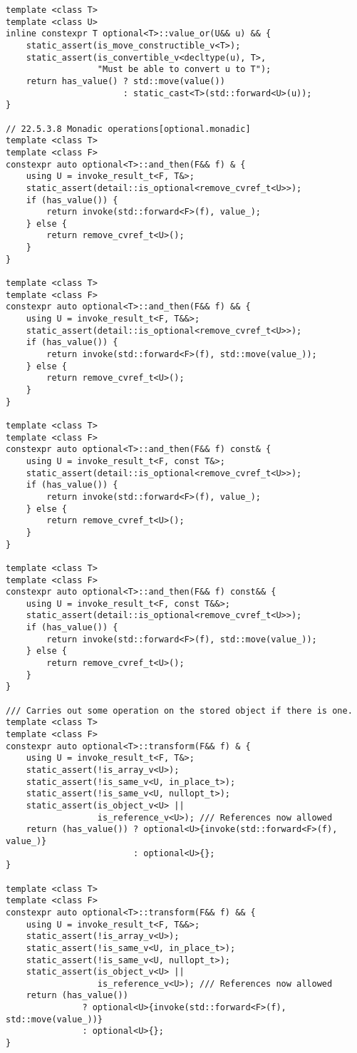 \documentclass[a4paper,10pt,oneside,openany,final,article]{memoir}
\begin{document}
\begin{verbatim}
template <class T>
template <class U>
inline constexpr T optional<T>::value_or(U&& u) && {
    static_assert(is_move_constructible_v<T>);
    static_assert(is_convertible_v<decltype(u), T>,
                  "Must be able to convert u to T");
    return has_value() ? std::move(value())
                       : static_cast<T>(std::forward<U>(u));
}

// 22.5.3.8 Monadic operations[optional.monadic]
template <class T>
template <class F>
constexpr auto optional<T>::and_then(F&& f) & {
    using U = invoke_result_t<F, T&>;
    static_assert(detail::is_optional<remove_cvref_t<U>>);
    if (has_value()) {
        return invoke(std::forward<F>(f), value_);
    } else {
        return remove_cvref_t<U>();
    }
}

template <class T>
template <class F>
constexpr auto optional<T>::and_then(F&& f) && {
    using U = invoke_result_t<F, T&&>;
    static_assert(detail::is_optional<remove_cvref_t<U>>);
    if (has_value()) {
        return invoke(std::forward<F>(f), std::move(value_));
    } else {
        return remove_cvref_t<U>();
    }
}

template <class T>
template <class F>
constexpr auto optional<T>::and_then(F&& f) const& {
    using U = invoke_result_t<F, const T&>;
    static_assert(detail::is_optional<remove_cvref_t<U>>);
    if (has_value()) {
        return invoke(std::forward<F>(f), value_);
    } else {
        return remove_cvref_t<U>();
    }
}

template <class T>
template <class F>
constexpr auto optional<T>::and_then(F&& f) const&& {
    using U = invoke_result_t<F, const T&&>;
    static_assert(detail::is_optional<remove_cvref_t<U>>);
    if (has_value()) {
        return invoke(std::forward<F>(f), std::move(value_));
    } else {
        return remove_cvref_t<U>();
    }
}

/// Carries out some operation on the stored object if there is one.
template <class T>
template <class F>
constexpr auto optional<T>::transform(F&& f) & {
    using U = invoke_result_t<F, T&>;
    static_assert(!is_array_v<U>);
    static_assert(!is_same_v<U, in_place_t>);
    static_assert(!is_same_v<U, nullopt_t>);
    static_assert(is_object_v<U> ||
                  is_reference_v<U>); /// References now allowed
    return (has_value()) ? optional<U>{invoke(std::forward<F>(f), value_)}
                         : optional<U>{};
}

template <class T>
template <class F>
constexpr auto optional<T>::transform(F&& f) && {
    using U = invoke_result_t<F, T&&>;
    static_assert(!is_array_v<U>);
    static_assert(!is_same_v<U, in_place_t>);
    static_assert(!is_same_v<U, nullopt_t>);
    static_assert(is_object_v<U> ||
                  is_reference_v<U>); /// References now allowed
    return (has_value())
               ? optional<U>{invoke(std::forward<F>(f), std::move(value_))}
               : optional<U>{};
}


\end{verbatim}
\end{document}
